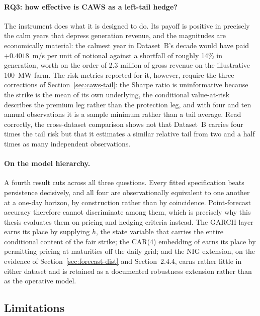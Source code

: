 \documentclass[11pt, a4paper, twoside]{article}
\begin{document}
\paragraph{RQ3: how effective is CAWS as a left-tail hedge?} The instrument does what it is designed to do. Its payoff is positive in precisely the calm years that depress generation revenue, and the magnitudes are economically material: the calmest year in Dataset~B's decade would have paid $+0.4018$~m/s per unit of notional against a shortfall of roughly 14\% in generation, worth on the order of \texteuro{}2.3 million of gross revenue on the illustrative 100~MW farm. The risk metrics reported for it, however, require the three corrections of Section~\ref{sec:caws-tail}: the Sharpe ratio is uninformative because the strike is the mean of its own underlying, the conditional value-at-risk describes the premium leg rather than the protection leg, and with four and ten annual observations it is a sample minimum rather than a tail average. Read correctly, the cross-dataset comparison shows not that Dataset~B carries four times the tail risk but that it estimates a similar relative tail from two and a half times as many independent observations.

\paragraph{On the model hierarchy.} A fourth result cuts across all three questions. Every fitted specification beats persistence decisively, and all four are observationally equivalent to one another at a one-day horizon, by construction rather than by coincidence. Point-forecast accuracy therefore cannot discriminate among them, which is precisely why this thesis evaluates them on pricing and hedging criteria instead. The GARCH layer earns its place by supplying $h$, the state variable that carries the entire conditional content of the fair strike; the CAR(4) embedding of \citet{BenthSaltyteBenth2009} earns its place by permitting pricing at maturities off the daily grid; and the NIG extension, on the evidence of Section~\ref{sec:forecast-dist} and Section~2.4.4, earns rather little in either dataset and is retained as a documented robustness extension rather than as the operative model.

\subsection{Limitations}
\label{sec:concl-limits}
\end{document}
